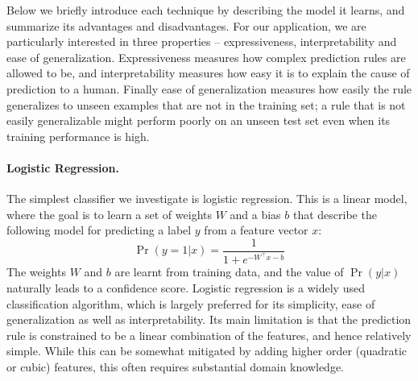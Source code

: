 Below we briefly introduce each technique by describing the model it learns, and summarize its advantages and disadvantages. For our application, we are particularly interested in three properties -- expressiveness, interpretability and ease of generalization. Expressiveness measures how complex prediction rules are allowed to be, and interpretability measures how easy it is to explain the cause of prediction to a human. Finally ease of generalization measures how easily the rule generalizes to unseen examples that are not in the training set; a rule that is not easily generalizable might perform poorly on an unseen test set even when its training performance is high.


 

\paragraph{Logistic Regression.} The simplest classifier we investigate is logistic regression. This is a linear model, where the goal is to learn a set of weights $W$ and a bias $b$ that describe the following model for predicting a label $y$ from a feature vector $x$:
\[ \Pr(y = 1 | x) = \frac{1}{1 + e^{-W^{\top} x - b}} \]
The weights $W$ and $b$ are learnt from training data, and the value of $\Pr(y | x)$ naturally leads to a confidence score. Logistic regression is a widely used classification algorithm, which is largely preferred for its simplicity, ease of generalization as well as interpretability. Its main limitation is that the prediction rule is constrained to be a linear combination of the features, and hence relatively simple. While this can be somewhat mitigated by adding higher order (quadratic or cubic) features, this often requires substantial domain knowledge.

